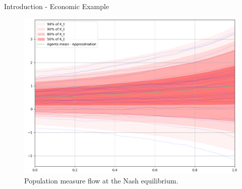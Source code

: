 \documentclass{beamer}
\begin{document}
\begin{frame}{Introduction - Economic Example}

\begin{figure}[h!]
\includegraphics[width=\textwidth]{presentation/population_measure_flow_upper.png}
\caption[Economic Growth Model Population Measure Flow]{Population measure flow at the Nash equilibrium.}
\label{economicGrowthModel:populationMeasureFlow}
\end{figure}

\end{frame}
\end{document}
